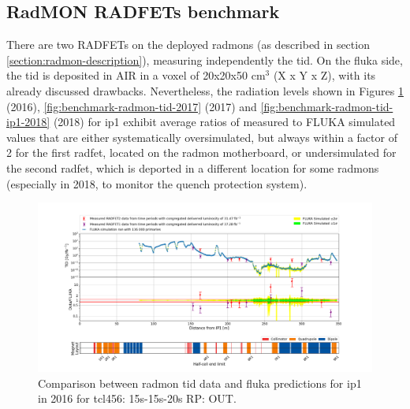 \documentclass[encoding=utf8,british]{tumphthesis}
\begin{document}
\subsection{RadMON RADFETs benchmark}
\label{subsection:lhc-benchmark-radmon-radfet}

There are two RADFETs on the deployed \acrshort{radmon}s (as described in section \ref{section:radmon-description}), measuring independently the \acrshort{tid}. On the \acrshort{fluka} side, the \acrshort{tid} is deposited in AIR in a voxel of 20x20x50 cm$^3$ (X x Y x Z), with its already discussed drawbacks. Nevertheless, the radiation levels shown in Figures \ref{fig:benchmark-radmon-tid-2016} (2016), \ref{fig:benchmark-radmon-tid-2017} (2017) and \ref{fig:benchmark-radmon-tid-ip1-2018} (2018) for \acrshort{ip}1 exhibit average ratios of measured to FLUKA simulated values that are either systematically oversimulated, but always within a factor of 2 for the first \acrshort{radfet}, located on the \acrshort{radmon} motherboard, or undersimulated for the second \acrshort{radfet}, which is deported in a different location for some \acrshort{radmon}s (especially in 2018, to monitor the quench protection system).

\newpage


\begin{figure}[H]
    \centering
    \includegraphics[width=0.9\linewidth]{results/benchmark_RadMON_TID_IP1_2016_0_350m.png}
    \caption{Comparison between \acrshort{radmon} \acrshort{tid} data and \acrshort{fluka} predictions for \acrshort{ip}1 in 2016 for \acrshort{tcl}456: 15s-15s-20s RP: OUT.}
    \label{fig:benchmark-radmon-tid-2016}
\end{figure}
\end{document}
